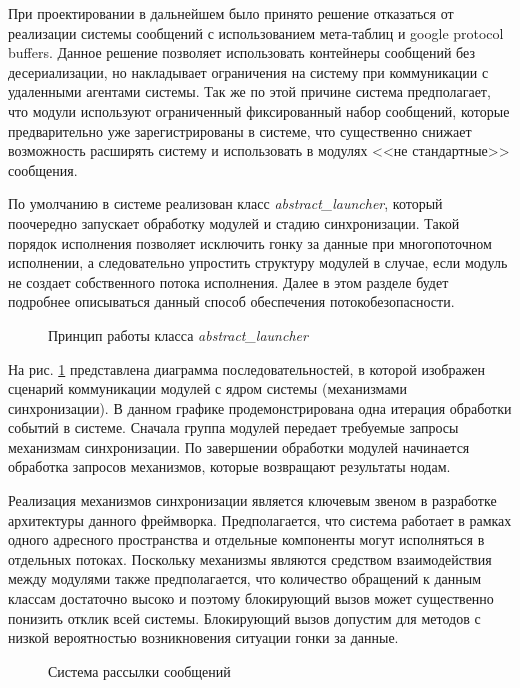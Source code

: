 При проектировании в дальнейшем было принято решение отказаться 
от реализации системы сообщений с использованием мета-таблиц и 
google protocol buffers. Данное решение позволяет использовать 
контейнеры сообщений без десериализации, но накладывает 
ограничения на систему при коммуникации с удаленными агентами 
системы. Так же по этой причине система предполагает, что модули 
используют ограниченный фиксированный набор сообщений, которые 
предварительно уже зарегистрированы в системе, что существенно 
снижает возможность расширять систему и использовать в модулях 
<<не стандартные>> сообщения.

По умолчанию в системе реализован класс 
\textit{abstract\_launcher}, который поочередно запускает 
обработку модулей и стадию синхронизации. Такой порядок 
исполнения позволяет исключить гонку за данные при многопоточном 
исполнении, а следовательно упростить структуру модулей в 
случае, если модуль не создает собственного потока исполнения. 
Далее в этом разделе будет подробнее описываться данный способ 
обеспечения потокобезопасности.

\begin{figure}[h]
    \caption{Принцип работы класса \textit{abstract\_launcher}}
    \label{im:2_2_2_sequence_diag}
\end{figure}

На рис. \ref{im:2_2_2_sequence_diag} представлена диаграмма 
последовательностей, в которой изображен сценарий коммуникации 
модулей с ядром системы (механизмами синхронизации). В данном 
графике продемонстрирована одна итерация обработки событий в 
системе. Сначала группа модулей передает требуемые запросы 
механизмам синхронизации. По завершении обработки модулей 
начинается обработка запросов механизмов, которые возвращают 
результаты нодам.

Реализация механизмов синхронизации является ключевым звеном в разработке архитектуры данного фреймворка. Предполагается, что система работает в рамках одного адресного пространства и отдельные компоненты могут исполняться в отдельных потоках. Поскольку механизмы являются средством взаимодействия между модулями также предполагается, что количество обращений к данным классам достаточно высоко и поэтому блокирующий вызов может существенно понизить отклик всей системы. Блокирующий вызов допустим для методов с низкой вероятностью возникновения ситуации гонки за данные.

\begin{figure}[h]
    \caption{Система рассылки сообщений}
    \label{im:2_2_3_topic}
\end{figure}

